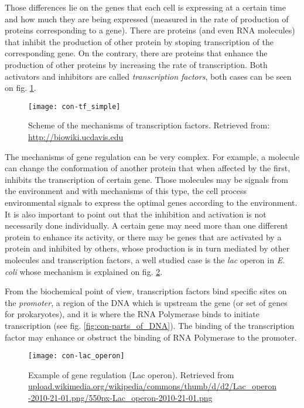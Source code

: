 Those differences lie on the genes that each cell is expressing at a certain time and how much they are being expressed (measured in the rate of production of proteins corresponding to a gene). There are proteins (and even RNA molecules) that inhibit the production of other protein by stoping transcription of the corresponding gene. On the contrary, there are proteins that enhance the production of other proteins by increasing the rate of transcription. Both activators and inhibitors are called \textit{transcription factors}, both cases can be seen on fig. \ref{fig:con-tf_simple}.

\begin{figure}[H]
  \centering
  \texttt{[image: con-tf\_simple]}
  \caption[Transcription factors]{\label{fig:con-tf_simple} Scheme of the mechanisms of transcription factors. Retrieved from: \url{http://biowiki.ucdavis.edu}}
\end{figure}

The mechanisms of gene regulation can be very complex. For example, a molecule can change the conformation of another protein that when affected by the first, inhibits the transcription of certain gene. Those molecules may be signals from the environment and with mechanisms of this type, the cell process environmental signals to express the optimal genes according to the environment. It is also important to point out that the inhibition and activation is not necessarily done individually. A certain gene may need more than one different protein to enhance its activity, or there may be genes that are activated by a protein and inhibited by others, whose production is in turn mediated by other molecules and transcription factors, a well studied case is the \textit{lac} operon in \textit{E. coli} whose mechanism is explained on fig. \ref{fig:con-lac_operon}.

From the biochemical point of view, transcription factors bind specific sites on the \textit{promoter}, a region of the DNA which is upstream the gene (or set of genes for prokaryotes), and it is where the RNA Polymerase binds to initiate transcription (see fig. \ref{fig:con-parts_of_DNA}). The binding of the transcription factor may enhance or obstruct the binding of RNA Polymerase to the promoter.

\begin{figure}[H]
  \centering
  \texttt{[image: con-lac\_operon]}
  \caption[Example of gene regulation]{\label{fig:con-lac_operon} Example of gene regulation (Lac operon). Retrieved from \url{upload.wikimedia.org/wikipedia/commons/thumb/d/d2/Lac_operon-2010-21-01.png/550px-Lac_operon-2010-21-01.png}}
\end{figure}

